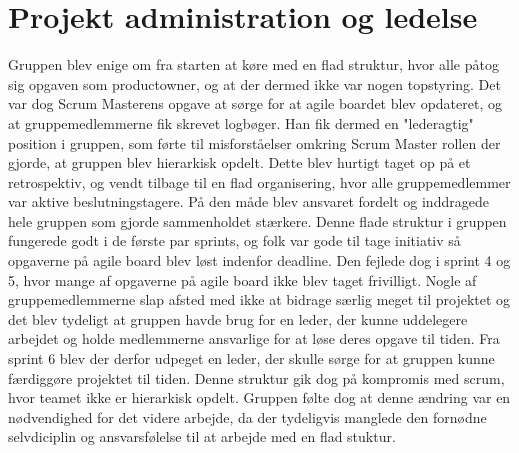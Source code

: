 \section{Projekt administration og ledelse}
Gruppen blev enige om fra starten at køre med en flad struktur, hvor alle påtog sig opgaven som productowner, og at der dermed ikke var nogen topstyring.  
Det var dog Scrum Masterens opgave at sørge for at agile boardet blev opdateret, og at gruppemedlemmerne fik skrevet logbøger. Han fik dermed en "lederagtig"
position i gruppen, som førte til misforståelser omkring Scrum Master rollen der gjorde, at gruppen blev hierarkisk opdelt. Dette blev hurtigt taget op på et 
retrospektiv, og vendt tilbage til en flad organisering, hvor alle gruppemedlemmer var aktive beslutningstagere. På den måde blev ansvaret fordelt og inddragede hele gruppen 
som gjorde sammenholdet stærkere. Denne flade struktur i gruppen fungerede godt i de første par sprints, og folk var gode til tage initiativ så opgaverne på
agile board blev løst indenfor deadline. Den fejlede dog i sprint 4 og 5, hvor mange af opgaverne på agile board ikke blev taget frivilligt. Nogle af gruppemedlemmerne
slap afsted med ikke at bidrage særlig meget til projektet og det blev tydeligt at gruppen havde brug for en leder, der kunne uddelegere arbejdet
og holde medlemmerne ansvarlige for at løse deres opgave til tiden. Fra sprint 6 blev der derfor udpeget en leder, der skulle sørge for at gruppen kunne 
færdiggøre projektet til tiden. Denne struktur gik dog på kompromis med scrum, hvor teamet ikke er hierarkisk opdelt. Gruppen følte dog at denne ændring var en
nødvendighed for det videre arbejde, da der tydeligvis manglede den fornødne selvdiciplin og ansvarsfølelse til at arbejde med en flad stuktur.

